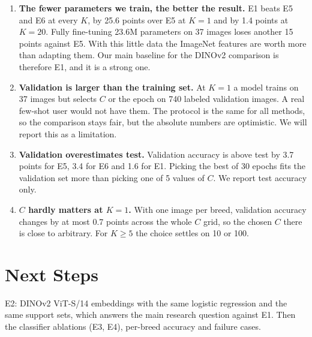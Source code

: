 \documentclass[11pt]{article}
\begin{document}
\begin{enumerate}
    \item \textbf{The fewer parameters we train, the better the result.} E1 beats E5 and E6 at
          every $K$, by 25.6 points over E5 at $K=1$ and by 1.4 points at $K=20$. Fully fine-tuning
          23.6M parameters on 37 images loses another 15 points against E5. With this little data
          the ImageNet features are worth more than adapting them. Our main baseline for the
          DINOv2 comparison is therefore E1, and it is a strong one.
    \item \textbf{Validation is larger than the training set.} At $K=1$ a model trains on 37 images
          but selects $C$ or the epoch on 740 labeled validation images. A real few-shot user would not
          have them. The protocol is the same for all methods, so the comparison stays fair, but the
          absolute numbers are optimistic. We will report this as a limitation.
    \item \textbf{Validation overestimates test.} Validation accuracy is above test by 3.7 points
          for E5, 3.4 for E6 and 1.6 for E1. Picking the best of 30 epochs fits the validation set more
          than picking one of 5 values of $C$. We report test accuracy only.
    \item \textbf{$C$ hardly matters at $K=1$.} With one image per breed, validation accuracy changes
          by at most 0.7 points across the whole $C$ grid, so the chosen $C$ there is close to arbitrary.
          For $K \ge 5$ the choice settles on 10 or 100.
\end{enumerate}

\section{Next Steps}

E2: DINOv2 ViT-S/14 embeddings with the same logistic regression and the same support sets,
which answers the main research question against E1. Then the classifier ablations (E3, E4),
per-breed accuracy and failure cases.
\end{document}
